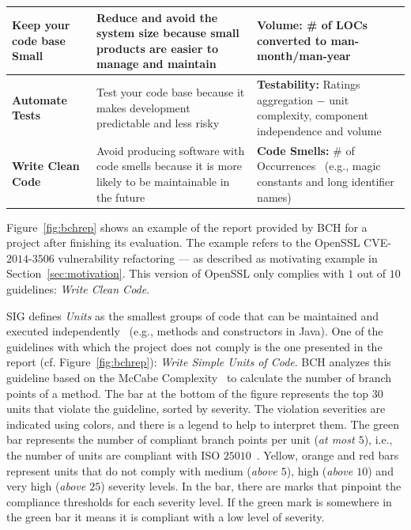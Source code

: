 \documentclass[sigconf,review]{acmart}
\begin{document}
\begin{table}[h]
\begin{tabular}{L{1.66cm}L{3.3cm}L{2.7cm}}
\textbf{Keep your code base Small} & Reduce and avoid the system size because
small products are easier to manage and maintain & \textbf{Volume:} \# of LOCs converted 
to man-month/man-year~\cite{criteria:2017} \\\midrule

\textbf{Automate Tests} & Test your code base because it makes development
predictable and less risky & \textbf{Testability:} Ratings aggregation $-$ unit 
complexity, component independence and volume~\cite{Visser:2016:OREILLY}
 \\\midrule

\textbf{Write Clean Code} & Avoid producing software with code smells because
it is more likely to be maintainable in the future & \textbf{Code Smells:} 
\# of Occurrences~\cite{Visser:2016:OREILLY} (e.g., magic constants and long 
identifier names) \\
\bottomrule
\end{tabular}
\label{tab:guidelines}
\end{table}


Figure~\ref{fig:bchrep} shows an example of the report
provided by BCH for a project after finishing its evaluation. The example
refers to the OpenSSL CVE-$2014$-$3506$ vulnerability refactoring ---
as described as motivating example in Section~\ref{sec:motivation}. This
version of OpenSSL only complies with $1$ out of $10$ guidelines: \emph{Write
Clean Code}.

SIG defines \emph{Units} as the smallest groups of code that can be maintained
and executed independently~\cite{Visser:2016:OREILLY} (e.g., methods and
constructors in Java). One of the guidelines with which the project does not
comply is the one presented in the report (cf. Figure~\ref{fig:bchrep}):
\emph{Write Simple Units of Code}. BCH analyzes this guideline based on the
McCabe Complexity~\cite{1702388} to calculate the number of branch points of a
method. The bar at the bottom of the figure represents the top $30$ units that
violate the guideline, sorted by severity. The violation severities are
indicated using colors, and there is a legend to help to interpret them. The
green bar represents the number of compliant branch points per unit (\emph{at
most $5$}), i.e., the number of units are compliant with ISO
$25010$~\cite{iso:2011}. Yellow, orange and red bars represent units that do not
comply with medium (\emph{above $5$}), high (\emph{above $10$}) and very high
(\emph{above $25$}) severity levels. In the bar, there are marks that pinpoint
the compliance thresholds for each severity level. If the green mark is
somewhere in the green bar it means it is compliant with a low level of
severity.
\end{document}
